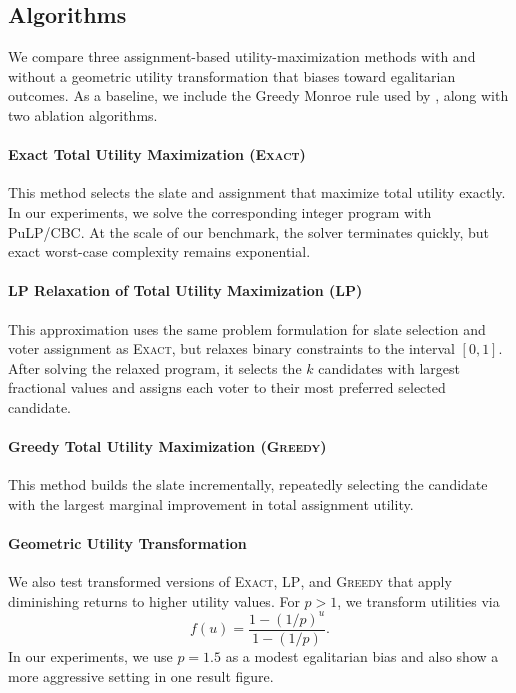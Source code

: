 \documentclass[11pt]{article}
\newcommand{\Exact}{\textsc{Exact}}
\newcommand{\Greedy}{\textsc{Greedy}}
\newcommand{\LP}{\textsc{LP}}
\begin{document}
\subsection{Algorithms}

We compare three assignment-based utility-maximization methods with and without a  geometric utility transformation that biases toward egalitarian outcomes. As a baseline, we include the Greedy Monroe rule \citep{skowron-2015} used by \citet{fish-v2}, along with two ablation algorithms.

\paragraph{Exact Total Utility Maximization (\Exact{})}
This method selects the slate and assignment that maximize total utility exactly. In our experiments, we solve the corresponding integer program with PuLP/CBC. At the scale of our benchmark, the solver terminates quickly, but exact worst-case complexity remains exponential.

\paragraph{LP Relaxation of Total Utility Maximization (\LP{})}
This approximation uses the same problem formulation for slate selection and voter assignment as \Exact{}, %
but relaxes binary constraints to the interval \([0,1]\). After solving the relaxed program, it selects the \(k\) candidates with largest fractional values and assigns each voter to their most preferred selected candidate.

\paragraph{Greedy Total Utility Maximization (\Greedy{})}
This method builds the slate incrementally, repeatedly selecting the candidate with the largest marginal improvement in total assignment utility.

\paragraph{Geometric Utility Transformation}
We also test transformed versions of \Exact{}, \LP{}, and \Greedy{} that apply diminishing returns to higher utility values. For \(p>1\), we transform utilities via
\[
f(u)=\frac{1-(1/p)^u}{1-(1/p)}.
\]
In our experiments, we use \(p=1.5\) as a modest egalitarian bias and also show a more aggressive setting in one result figure.
\end{document}
